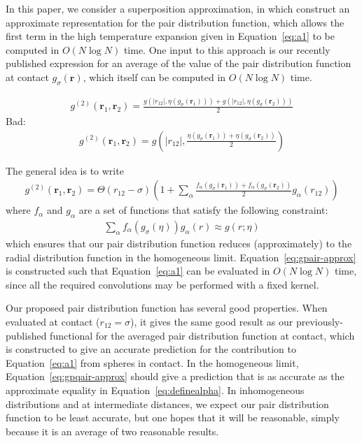 \documentclass[letterpaper,twocolumn,amsmath,amssymb,pre]{revtex4-1}
\newcommand{\rr}{\textbf{r}}
\begin{document}
In this paper, we consider a superposition approximation, in which
construct an approximate representation for the pair distribution
function, which allows the first term in the high temperature
expansion given in Equation~\ref{eq:a1} to be computed in $O(N\log N)$
time.  One input to this approach is our recently published expression
for an average of the value of the pair distribution function at
contact $g_\sigma(\rr)$, which itself can be computed in $O(N\log N)$
time.

\begin{align}
  g^{(2)}(\rr_1,\rr_2) = \frac{g(|r_{12}|, \eta(g_\sigma(\rr_1))) + g(|r_{12}|, \eta(g_\sigma(\rr_2)))}{2}
\end{align}
Bad:
\begin{align}
  g^{(2)}(\rr_1,\rr_2) = g\left(|r_{12}|, \frac{\eta(g_\sigma(\rr_1)) + \eta(g_\sigma(\rr_2))}{2}\right)
\end{align}

The general idea is to write
\begin{align}
  g^{(2)}(\rr_1,\rr_2) = \Theta(r_{12}-\sigma)
  \left(1 + \sum_{\alpha} \frac{f_{\alpha}(g_\sigma(\rr_1)) + f_{\alpha}(g_\sigma(\rr_2))}{2}g_{\alpha}(r_{12})\right)\label{eq:gpair-approx}
\end{align}
where $f_{\alpha}$ and $g_{\alpha}$ are a set of functions that
satisfy the following constraint:
\begin{align}\label{eq:definealpha}
  \sum_{\alpha} f_{\alpha}(g_\sigma(\eta)) g_{\alpha}(r) \approx g(r; \eta)
\end{align}
which ensures that our pair distribution function reduces
(approximately) to the radial distribution function in the homogeneous
limit.  Equation~\ref{eq:gpair-approx} is constructed such that
Equation~\ref{eq:a1} can be evaluated in $O(N\log N)$ time, since all
the required convolutions may be performed with a fixed kernel.

Our proposed pair distribution function has several good properties.
When evaluated at contact ($r_{12}=\sigma$), it gives the same good
result as our previously-published functional for the averaged pair
distribution function at contact, which is constructed to give an
accurate prediction for the contribution to Equation~\ref{eq:a1} from
spheres in contact.  In the homogeneous limit,
Equation~\ref{eq:gpqair-approx} should give a prediction that is as
accurate as the approximate equality in
Equation~\ref{eq:definealpha}.  In inhomogeneous distributions and at
intermediate distances, we expect our pair distribution function to be
least accurate, but one hopes that it will be reasonable, simply
because it is an average of two reasonable results.
\end{document}
